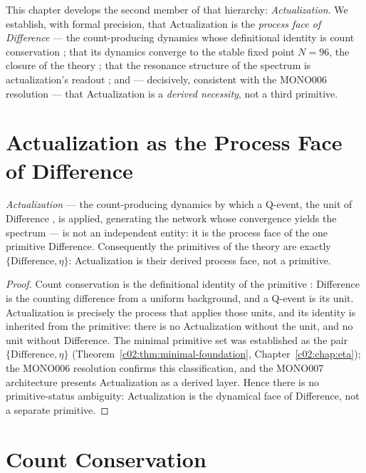 This chapter develops the second member of that hierarchy: \emph{Actualization}. We
establish, with formal precision, that Actualization is the \emph{process face of
Difference} --- the count-producing dynamics whose definitional identity is count
conservation \cite{c03:QG268}; that its dynamics converge to the stable fixed point $N=96$, the
closure of the theory \cite{c03:QG282}; that the resonance structure of the spectrum is
actualization's readout \cite{c03:QG272}; and --- decisively, consistent with the MONO006
resolution \cite{c03:MONO006} --- that Actualization is a \emph{derived necessity}, not a third
primitive.

\section{Actualization as the Process Face of Difference}
\label{c03:sec:process-face}

\begin{theorem}
\label{c03:thm:process-face}
\emph{Actualization} --- the count-producing dynamics by which a Q-event, the unit of
Difference \cite{c03:QG268}, is applied, generating the network whose convergence yields the
spectrum --- is not an independent entity: it is the process face of the one primitive
Difference. Consequently the primitives of the theory are exactly
$\{\text{Difference},\eta\}$: Actualization is their derived process face, not a primitive.
\end{theorem}

\begin{proof}
Count conservation is the definitional identity of the primitive \cite{c03:QG268}: Difference is
the counting difference from a uniform background, and a Q-event is its unit. Actualization
is precisely the process that applies those units, and its identity is inherited from the
primitive: there is no Actualization without the unit, and no unit without Difference. The
minimal primitive set was established as the pair $\{\text{Difference},\eta\}$
(Theorem~\ref{c02:thm:minimal-foundation}, Chapter~\ref{c02:chap:eta}); the MONO006 resolution
\cite{c03:MONO006} confirms this classification, and the MONO007 architecture \cite{c03:MONO007}
presents Actualization as a derived layer. Hence there is no primitive-status ambiguity:
Actualization is the dynamical face of Difference, not a separate primitive.
\end{proof}

\section{Count Conservation}
\label{c03:sec:count-conservation}

